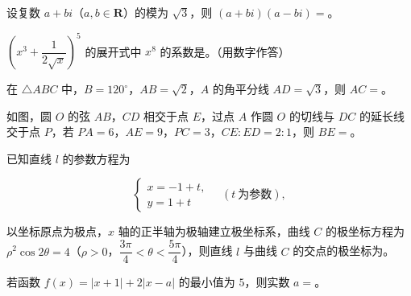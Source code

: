 \begin{question}
设复数 $a+bi$（$a,b\in\mathbf{R}$）的模为 $\sqrt{3}$，则 $(a+bi)(a-bi)=$\gkblank{}。

\end{question}
\begin{question}
$\left(x^{3}+\dfrac{1}{2\sqrt{x}}\right)^{5}$ 的展开式中 $x^{8}$ 的系数是\gkblank{}。（用数字作答）

\end{question}
\begin{question}
在 $\triangle ABC$ 中，$B=120^\circ$，$AB=\sqrt{2}$，$A$ 的角平分线 $AD=\sqrt{3}$，则 $AC=$\gkblank{}。

\Needspace{0.4\textheight}
\end{question}
\begin{question}
如图，圆 $O$ 的弦 $AB$，$CD$ 相交于点 $E$，过点 $A$ 作圆 $O$ 的切线与 $DC$ 的延长线交于点 $P$，若 $PA=6$，$AE=9$，$PC=3$，$CE:ED=2:1$，则 $BE=$\gkblank{}。
\nopagebreak[4]
\begin{center}\end{center}
\nopagebreak[4]
\end{question}
\begin{question}
已知直线 $l$ 的参数方程为

\nopagebreak[4]
\[
\begin{cases}
x=-1+t,\\
y=1+t
\end{cases}
\quad (t\ \text{为参数}),
\]

以坐标原点为极点，$x$ 轴的正半轴为极轴建立极坐标系，曲线 $C$ 的极坐标方程为 $\rho^{2}\cos 2\theta=4$（$\rho>0$，$\dfrac{3\pi}{4}<\theta<\dfrac{5\pi}{4}$），则直线 $l$ 与曲线 $C$ 的交点的极坐标为\gkblank{}。

\end{question}
\begin{question}
若函数 $f(x)=|x+1|+2|x-a|$ 的最小值为 $5$，则实数 $a=$\gkblank{}。

\end{question}

